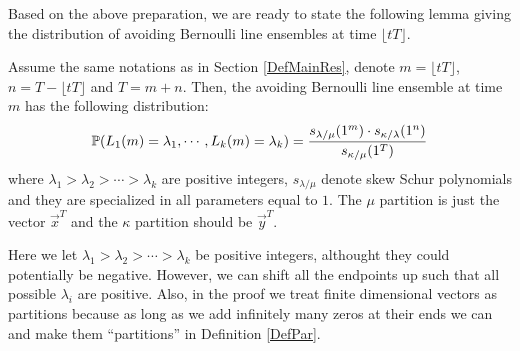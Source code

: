 Based on the above preparation, we are ready to state the following lemma giving the distribution of avoiding Bernoulli line ensembles at time $\lfloor tT \rfloor$.
\begin{lemma}{\label{BerDist}}
Assume the same notations as in Section \ref{DefMainRes}, denote $m=\lfloor tT \rfloor$, $n=T-\lfloor tT \rfloor$ and $T=m+n$. Then, the avoiding Bernoulli line ensemble at time $m$ has the following distribution: 
\begin{align}{\label{ProbMassFunc}}
\mathbb{P}(L_{1}(m) = \lambda_{1}, \cdots, L_{k}(m) = \lambda_{k})=\frac{s_{\lambda/\mu}(1^{m})\cdot s_{\kappa/\lambda}(1^{n})}{s_{\kappa/\mu}(1^{T})}	
\end{align}
where $\lambda_{1}>\lambda_{2}>\cdots >\lambda_{k}$ are positive integers, $s_{\lambda/\mu}$ denote skew Schur polynomials and they are specialized in all parameters equal to $1$. The $\mu$ partition is just the vector $\vec{x}^{T}$ and the $\kappa$ partition should be $\vec{y}^{T}$.
\end{lemma}
\begin{remark}
	Here we let $\lambda_{1}>\lambda_{2}>\cdots>\lambda_{k}$ be positive integers, althought they could potentially be negative. However, we can shift all the endpoints up such that all possible $\lambda_{i}$ are positive. Also, in the proof we treat finite dimensional vectors as partitions because as long as we add infinitely many zeros at their ends we can and make them  ``partitions'' in Definition \ref{DefPar}.
\end{remark}
